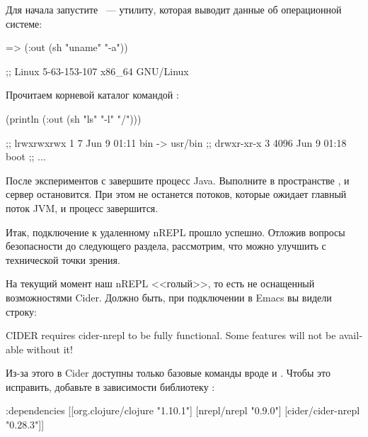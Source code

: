 Для начала запустите ~--- утилиту, которая выводит данные об операционной системе:

\begin{english}
  \begin{clojure}
=> (:out (sh "uname" "-a"))

;; Linux 5-63-153-107 x86_64 GNU/Linux
  \end{clojure}
\end{english}

Прочитаем корневой каталог командой :

\begin{english}
  \begin{text}
(println (:out (sh "ls" "-l" "/")))

;; lrwxrwxrwx   1    7 Jun  9 01:11 bin -> usr/bin
;; drwxr-xr-x   3 4096 Jun  9 01:18 boot
;; ...
  \end{text}
\end{english}

После экспериментов с  завершите процесс Java. Выполните  в пространстве , и сервер остановится. При этом не останется потоков, которые ожидает главный поток JVM, и процесс завершится.

Итак, подключение к удаленному nREPL прошло успешно. Отложив вопросы безопасности до следующего раздела, рассмотрим, что можно улучшить с технической точки зрения.

На текущий момент наш nREPL <<голый>>, то есть не оснащенный возможностями Cider. Должно быть, при подключении в Emacs вы видели строку:

\begin{english}
  \begin{text}
CIDER requires cider-nrepl to be fully functional.
Some features will not be available without it!
  \end{text}
\end{english}

Из-за этого в Cider доступны только базовые команды вроде  и . Чтобы это исправить, добавьте в зависимости библиотеку :

\begin{english}
  \begin{clojure}
  :dependencies
  [[org.clojure/clojure "1.10.1"]
   [nrepl/nrepl "0.9.0"]
   [cider/cider-nrepl "0.28.3"]]
  \end{clojure}
\end{english}

